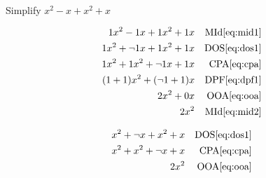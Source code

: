 \begin{example}[id:20141106-154547] \label{20141106-154547}  \hfill \\

Simplify $x^2-x+x^2+x$ 

\soln

\solnsteps
\begin{align*}
1x^2-1x+1x^2+1x && \text{MId} \eqref{eq:mid1} \\
1x^2+\neg 1 x + 1x^2+1x && \text{DOS} \eqref{eq:dos1} \\
1x^2+1x^2+\neg 1x+1x && \text{CPA} \eqref{eq:cpa} \\
(1+1)x^2+(\neg 1 + 1)x && \text{DPF} \eqref{eq:dpf1} \\ 
2x^2+0x && \text{OOA} \eqref{eq:ooa} \\
2x^2 && \text{MId} \eqref{eq:mid2} 
\end{align*}

\soln

\lesssteps
\begin{align*}
x^2 + \neg x + x^2 + x && \text{DOS} \eqref{eq:dos1} \\
x^2 + x^2 + \neg x + x && \text{CPA} \eqref{eq:cpa} \\
2x^2 && \text{OOA} \eqref{eq:ooa} 
\end{align*}

\end{example}


